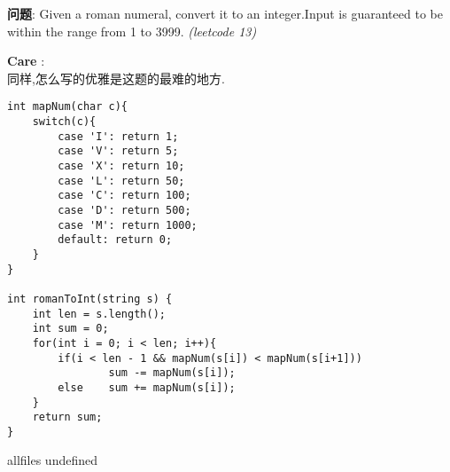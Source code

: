 \documentclass{article}
\begin{document}
\begin{CJK}{UTF8}{gbsn}     %

\else
    
\begin{description}
    \item{\textbf{问题}}: Given a roman numeral, convert it to an integer.Input is guaranteed to be within the range from 1 to 3999. \textit{(leetcode 13)}
    \item{\textbf{Care}} : 
    \\同样,怎么写的优雅是这题的最难的地方.
    \begin{lstlisting}
int mapNum(char c){
	switch(c){
		case 'I': return 1;
		case 'V': return 5;
		case 'X': return 10;
		case 'L': return 50;
		case 'C': return 100;
		case 'D': return 500;
		case 'M': return 1000;
		default: return 0;
	}
}

int romanToInt(string s) {
	int len = s.length();
	int sum = 0;
	for(int i = 0; i < len; i++){
		if(i < len - 1 && mapNum(s[i]) < mapNum(s[i+1]))	
				sum -= mapNum(s[i]);
		else	sum += mapNum(s[i]);
	}
	return sum;
}
    \end{lstlisting}
\end{description}

\fi

\ifx allfiles undefined
\end{CJK}
\end{document}
